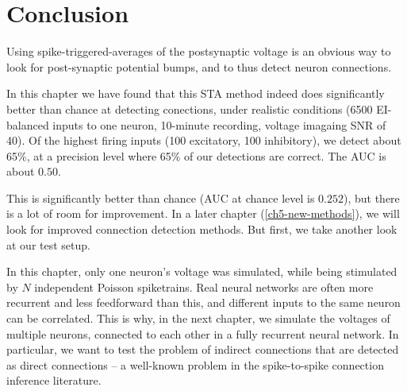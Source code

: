 \FloatBarrier
\section{Conclusion}

Using spike-triggered-averages of the postsynaptic voltage is an obvious way to look for post-synaptic potential bumps, and to thus detect neuron connections.

In this chapter we have found that this STA method indeed does significantly better than chance at detecting conections, under realistic conditions (6500 EI-balanced inputs to one neuron, 10-minute recording, voltage imagaing SNR of 40).
Of the highest firing inputs (100 excitatory, 100 inhibitory), we detect about 65\%, at a precision level where 65\% of our detections are correct. The AUC is about $0.50$.


This is significantly better than chance (AUC at chance level is $0.252$), but there is a lot of room for improvement. In a later chapter (\cref{ch5-new-methods}), we will look for improved connection detection methods. But first, we take another look at our test setup.

In this chapter, only one neuron's voltage was simulated, while being stimulated by $N$ independent Poisson spiketrains. Real neural networks are often more recurrent and less feedforward than this, and different inputs to the same neuron can be correlated. This is why, in the next chapter, we simulate the voltages of multiple neurons, connected to each other in a fully recurrent neural network. In particular, we want to test the problem of indirect connections that are detected as direct connections -- a well-known problem in the spike-to-spike connection inference literature.\cite{Orlandi2017FirstConnectomicsChallenge,Das2020SystematicErrorsConnectivity}

